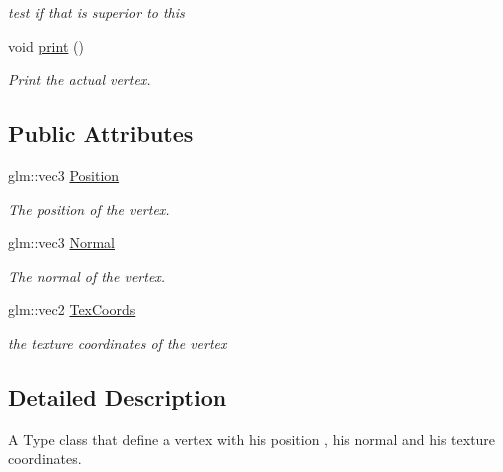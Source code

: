 \begin{DoxyCompactItemize}
\begin{DoxyCompactList}\small\item\em test if that is superior to this \end{DoxyCompactList}\item 
\mbox{\label{class_vertex_abc2531c8f9b2eed32478f4fba4603e88}} 
void \mbox{\hyperlink{class_vertex_abc2531c8f9b2eed32478f4fba4603e88}{print}} ()
\begin{DoxyCompactList}\small\item\em Print the actual vertex. \end{DoxyCompactList}\end{DoxyCompactItemize}
\subsection*{Public Attributes}
\begin{DoxyCompactItemize}
\item 
\mbox{\label{class_vertex_abb3cfacd96b5955b0cec9359840ee49f}} 
glm\+::vec3 \mbox{\hyperlink{class_vertex_abb3cfacd96b5955b0cec9359840ee49f}{Position}}
\begin{DoxyCompactList}\small\item\em The position of the vertex. \end{DoxyCompactList}\item 
\mbox{\label{class_vertex_a9ab4dc431b41509f0b1bb1a4bf09d4e2}} 
glm\+::vec3 \mbox{\hyperlink{class_vertex_a9ab4dc431b41509f0b1bb1a4bf09d4e2}{Normal}}
\begin{DoxyCompactList}\small\item\em The normal of the vertex. \end{DoxyCompactList}\item 
\mbox{\label{class_vertex_a921a513c1e6d1e63e99d477fa837a317}} 
glm\+::vec2 \mbox{\hyperlink{class_vertex_a921a513c1e6d1e63e99d477fa837a317}{Tex\+Coords}}
\begin{DoxyCompactList}\small\item\em the texture coordinates of the vertex \end{DoxyCompactList}\end{DoxyCompactItemize}


\subsection{Detailed Description}
A Type class that define a vertex with his position , his normal and his texture coordinates. 

